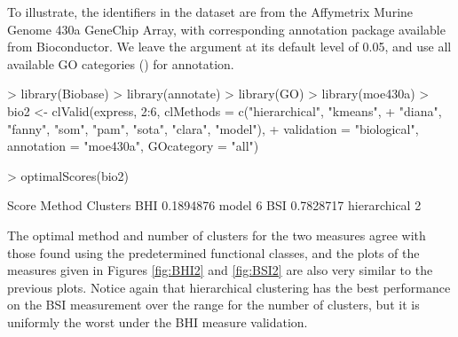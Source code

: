 \documentclass[11pt]{article}
\begin{document}
To illustrate, the identifiers in the dataset  are from the
Affymetrix Murine Genome 430a GeneChip Array, with corresponding
annotation package  available from Bioconductor.  We
leave the  argument at its default level of 0.05,
and use all available GO categories () for annotation.

\begin{Schunk}
\begin{Sinput}
> library(Biobase)
> library(annotate)
> library(GO)
> library(moe430a)
> bio2 <- clValid(express, 2:6, clMethods = c("hierarchical", "kmeans", 
+     "diana", "fanny", "som", "pam", "sota", "clara", "model"), 
+     validation = "biological", annotation = "moe430a", GOcategory = "all")
\end{Sinput}
\end{Schunk}

\begin{Schunk}
\begin{Sinput}
> optimalScores(bio2)
\end{Sinput}
\begin{Soutput}
        Score       Method Clusters
BHI 0.1894876        model        6
BSI 0.7828717 hierarchical        2
\end{Soutput}
\end{Schunk}

The optimal method and number of clusters for the two measures agree
with those found using the predetermined functional classes, and the   
plots of the measures given in Figures \ref{fig:BHI2} and
\ref{fig:BSI2} are also very similar to the previous plots.
Notice again that hierarchical clustering has the best performance on
the BSI measurement over the range for the number of clusters, 
but it is uniformly the worst under the BHI measure validation.  
\end{document}
